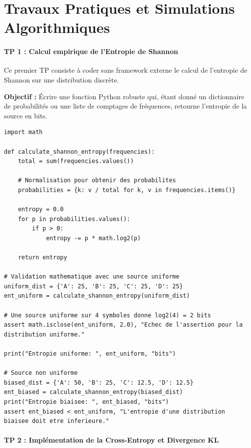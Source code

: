 \documentclass[11pt,a4paper]{article}
\begin{document}
\newpage
\part{Travaux Pratiques et Simulations Algorithmiques}
\subsection*{TP 1 : Calcul empirique de l'Entropie de Shannon }


Ce premier TP consiste à coder sans framework externe le calcul de l'entropie de Shannon sur une distribution discrète.

\textbf{Objectif :}
Écrire une fonction Python robuste qui, étant donné un dictionnaire de probabilités ou une liste de comptages de fréquences, retourne l'entropie de la source en bits.

\begin{lstlisting}
import math

def calculate_shannon_entropy(frequencies):
    total = sum(frequencies.values())

    # Normalisation pour obtenir des probabilites
    probabilities = {k: v / total for k, v in frequencies.items()}

    entropy = 0.0
    for p in probabilities.values():
        if p > 0:
            entropy -= p * math.log2(p)

    return entropy

# Validation mathematique avec une source uniforme
uniform_dist = {'A': 25, 'B': 25, 'C': 25, 'D': 25}
ent_uniform = calculate_shannon_entropy(uniform_dist)

# Une source uniforme sur 4 symboles donne log2(4) = 2 bits
assert math.isclose(ent_uniform, 2.0), "Echec de l'assertion pour la distribution uniforme."

print("Entropie uniforme: ", ent_uniform, "bits")

# Source non uniforme
biased_dist = {'A': 50, 'B': 25, 'C': 12.5, 'D': 12.5}
ent_biased = calculate_shannon_entropy(biased_dist)
print("Entropie biaisee: ", ent_biased, "bits")
assert ent_biased < ent_uniform, "L'entropie d'une distribution biaisee doit etre inferieure."
\end{lstlisting}


\subsection*{TP 2 : Implémentation de la Cross-Entropy et Divergence KL }
\end{document}
